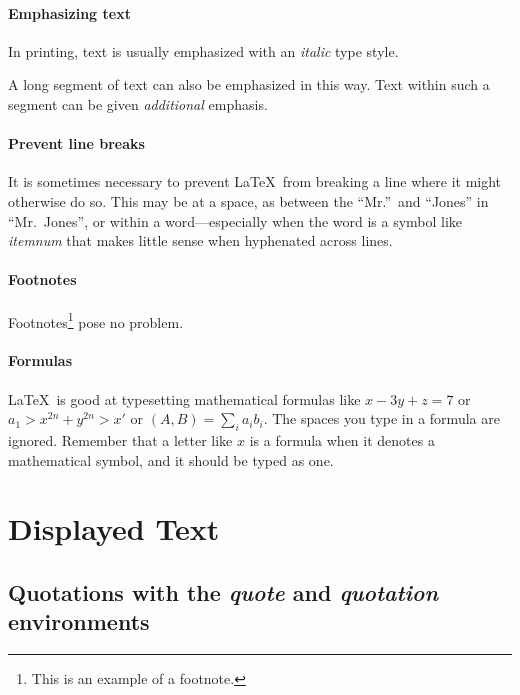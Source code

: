 \documentclass{article}      %
\newcommand{\ip}[2]{(#1, #2)}
\begin{document}
\paragraph{Emphasizing text} In printing, text is usually emphasized with an \emph{italic} type
 style.

\begin{em}
   A long segment of text can also be emphasized
   in this way.  Text within such a segment can be
   given \emph{additional} emphasis.
\end{em}

\paragraph{Prevent line breaks} It is sometimes necessary to prevent \LaTeX\ from breaking a line
 where it might otherwise do so. This may be at a space, as between the ``Mr.''\ and ``Jones'' in
 ``Mr.~Jones'', or within a word---especially when the word is a symbol like 
 \mbox{\emph{itemnum}} that makes little sense when hyphenated across lines. 

\paragraph{Footnotes} Footnotes\footnote{This is an example of a footnote.} pose no problem.

\paragraph{Formulas} \LaTeX\ is good at typesetting mathematical formulas like 
       \( x-3y + z = 7 \)
or 
       \( a_{1} > x^{2n} + y^{2n} > x' \) 
or 
       \( \ip{A}{B} = \sum_{i} a_{i} b_{i} \). 
The spaces you type in a formula are ignored. Remember that a letter like $x$ is a formula when it
denotes a mathematical symbol, and it should be typed as one.


\section{Displayed Text}

\subsection{Quotations with the \emph{quote} and \emph{quotation} environments}
\end{document}

